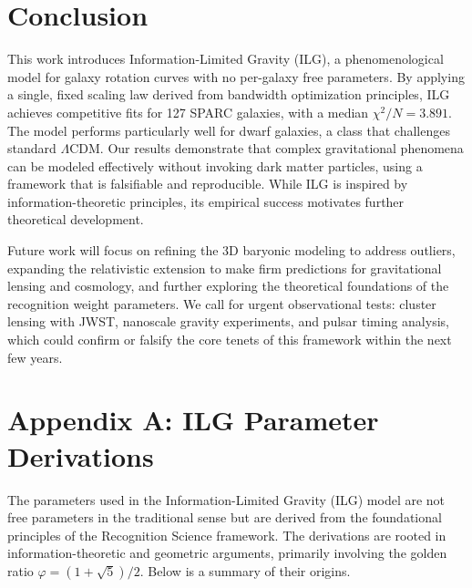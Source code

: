 \documentclass[12pt,a4paper]{article}
\begin{document}
\section{Conclusion}

This work introduces Information-Limited Gravity (ILG), a phenomenological model for galaxy rotation curves with no per-galaxy free parameters. By applying a single, fixed scaling law derived from bandwidth optimization principles, ILG achieves competitive fits for 127 SPARC galaxies, with a median $\chi^2/N = 3.891$. The model performs particularly well for dwarf galaxies, a class that challenges standard $\Lambda$CDM. Our results demonstrate that complex gravitational phenomena can be modeled effectively without invoking dark matter particles, using a framework that is falsifiable and reproducible.
While ILG is inspired by information-theoretic principles, its empirical success motivates further theoretical development.

Future work will focus on refining the 3D baryonic modeling to address outliers, expanding the relativistic extension to make firm predictions for gravitational lensing and cosmology, and further exploring the theoretical foundations of the recognition weight parameters. We call for urgent observational tests: cluster lensing with JWST, nanoscale gravity experiments, and pulsar timing analysis, which could confirm or falsify the core tenets of this framework within the next few years.

\appendix
\section*{Appendix A: ILG Parameter Derivations}

The parameters used in the Information-Limited Gravity (ILG) model are not free parameters in the traditional sense but are derived from the foundational principles of the Recognition Science framework. The derivations are rooted in information-theoretic and geometric arguments, primarily involving the golden ratio $\varphi = (1+\sqrt{5})/2$. Below is a summary of their origins.
\end{document}
